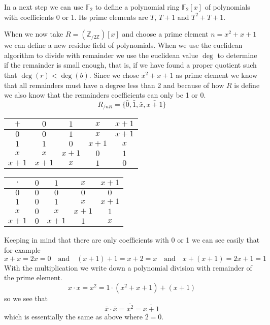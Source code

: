 In a next step we can use \(\mathbb{F}_2\) to define a polynomial ring \(\mathbb{F}_2 [x]\) of polynomials with coefficients 0 or 1.
Its prime elements are \(T\), \(T+1\) and \(T^2 + T + 1\).

When we now take \(R = (\mathbb{Z}_{/2\mathbb{Z}})[x]\) and choose a prime element \(n = x^2 + x + 1\) we can define a new residue field of polynomials.
When we use the euclidean algorithm to divide with remainder we use the euclidean value \(\deg\) to determine if the remainder is small enough, that is, if we have found a proper quotient such that \(\deg(r) < \deg(b)\).
Since we chose \(x^2 + x + 1\) as prime element we know that all remainders must have a degree less than 2 and because of how \(R\) is define we also know that the remainders coefficients can only be 1 or 0.
\[R_{/nR} = \{\bar{0}, \bar{1}, \bar{x}, \bar{x+1}\}\]

\begin{center}
   \begin{tabular}{c|c c c c}
      \(+\)   & \(0\)   & \(1\)   & \(x\)   & \(x+1\) \\ \hline
      \(0\)   & \(0\)   & \(1\)   & \(x\)   & \(x+1\) \\
      \(1\)   & \(1\)   & \(0\)   & \(x+1\) & \(x\)   \\
      \(x\)   & \(x\)   & \(x+1\) & \(0\)   & \(1\)   \\
      \(x+1\) & \(x+1\) & \(x\)   & \(1\)   & \(0\)   \\
   \end{tabular}
   \quad
   \begin{tabular}{c|c c c c}
      \(\cdot\) & \(0\) & \(1\)   & \(x\)   & \(x+1\) \\ \hline
      \(0\)     & \(0\) & \(0\)   & \(0\)   & \(0\)   \\
      \(1\)     & \(0\) & \(1\)   & \(x\)   & \(x+1\) \\
      \(x\)     & \(0\) & \(x\)   & \(x+1\) & \(1\)   \\
      \(x+1\)   & \(0\) & \(x+1\) & \(1\)   & \(x\)   \\
   \end{tabular}
\end{center}
Keeping in mind that there are only coefficients with 0 or 1 we can see easily that for example
\[x + x = 2x = 0 \quad\text{and}\quad  (x+1) + 1 = x + 2 = x \quad\text{and}\quad x + (x+1) = 2x + 1 = 1\]
With the multiplication we write down a polynomial division with remainder of the prime element.
\[x \cdot x = x^2 = 1 \cdot (x^2 + x + 1) + (x+1)\]
so we see that
\[\bar{x} \cdot \bar{x} = \bar{x^2} = \bar{x+1}\]
which is essentially the same as above where \(\bar{2} = \bar{0}\).

